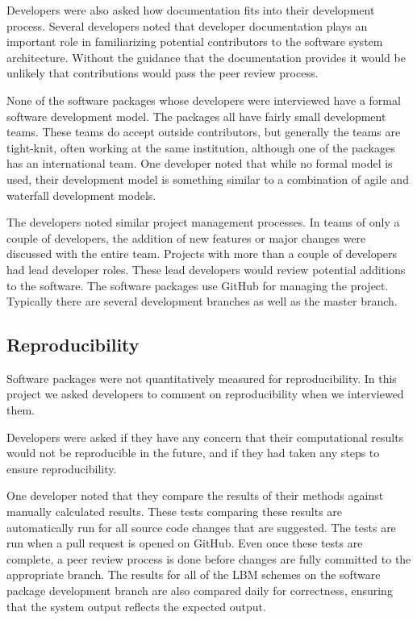 \documentclass[12pt, notitlepage]{article}
\begin{document}
Developers were also asked how documentation fits into their development process. Several developers noted that developer documentation plays an important role in familiarizing potential contributors to the software system architecture. Without the guidance that the documentation provides it would be unlikely that contributions would pass the peer review process. 

None of the software packages whose developers were interviewed have a formal software development model. The packages all have fairly small development teams. These teams do accept outside contributors, but generally the teams are tight-knit, often working at the same institution, although one of the packages has an international team. One developer noted that while no formal model is used, their development model is something similar to a combination of agile and waterfall development models. 

The developers noted similar project management processes. In teams of only a couple of developers, the addition of new features or major changes were discussed with the entire team. Projects with more than a couple of developers had lead developer roles. These lead developers would review potential additions to the software. The software packages use GitHub for managing the project. Typically there are several development branches as well as the master branch.

\subsection{Reproducibility}

Software packages were not quantitatively measured for reproducibility.
In this project we asked developers to comment on reproducibility when we interviewed them.

Developers were asked if they have any concern that their computational results would not be reproducible in the future, and if they had taken any steps to ensure reproducibility.

One developer noted that they compare the results of their methods against manually calculated results. These tests comparing these results are automatically run for all source code changes that are suggested. The tests are run when a pull request is opened on GitHub. Even once these tests are complete, a peer review process is done before changes are fully committed to the appropriate branch. The results for all of the LBM schemes on the software package development branch are also compared daily for correctness, ensuring that the system output reflects the expected output.  
\end{document}
